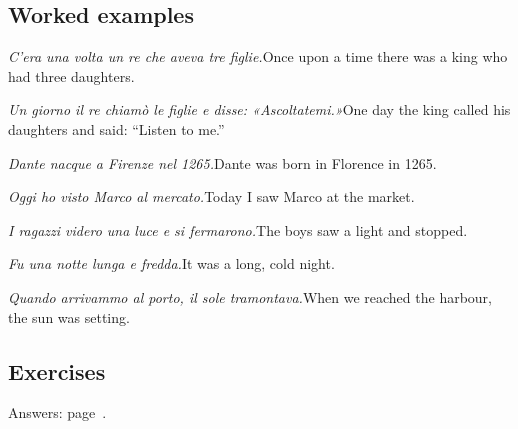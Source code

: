 \documentclass[11pt,a4paper,twoside,openright]{book}
\begin{document}
\subsection*{Worked examples}
\begin{examples}
\item\relax \textit{C'era una volta un re che aveva tre figlie.}\newline Once upon a time there was a king who had three daughters.
\item\relax \textit{Un giorno il re chiamò le figlie e disse: «Ascoltatemi.»}\newline One day the king called his daughters and said: “Listen to me.”
\item\relax \textit{Dante nacque a Firenze nel 1265.}\newline Dante was born in Florence in 1265.
\item\relax \textit{Oggi ho visto Marco al mercato.}\newline Today I saw Marco at the market.
\item\relax \textit{I ragazzi videro una luce e si fermarono.}\newline The boys saw a light and stopped.
\item\relax \textit{Fu una notte lunga e fredda.}\newline It was a long, cold night.
\item\relax \textit{Quando arrivammo al porto, il sole tramontava.}\newline When we reached the harbour, the sun was setting.
\end{examples}

\subsection*{Exercises}\label{les:passato-remoto:exercises}
{\color{muted}\small Answers: page~\pageref{ans:passato-remoto}.}
\end{document}
